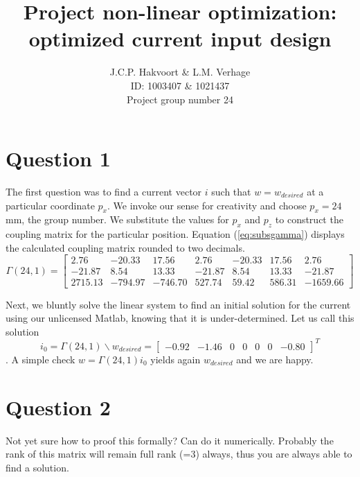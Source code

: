 \documentclass[a4paper,10pt]{article}
\begin{document}
\pagestyle{fancy}

\title{Project non-linear optimization: optimized current input design
}
\author{J.C.P. Hakvoort \& L.M. Verhage\\
        ID: 1003407 \& 1021437 \\
        Project group number 24} 


\maketitle
\thispagestyle{empty}

\section{Question 1} \label{sec:question1}
The first question was to find a current vector $i$ such that $w=w_{desired}$ at a particular coordinate $p_x$. We invoke our sense for creativity and choose $p_x=24$ mm, the group number. We substitute the values for $p_x$ and $p_z$ to construct the coupling matrix for the particular position. Equation (\ref{eq:subsgamma}) displays the calculated coupling matrix rounded to two decimals.
\begin{equation} \label{eq:subsgamma}
    \Gamma(24,1)=
\begin{bmatrix}
2.76    & -20.33    & 17.56     & 2.76      & -20.33    & 17.56     & 2.76 \\
-21.87  & 8.54      & 13.33     & -21.87    & 8.54      & 13.33     & -21.87 \\
2715.13 & -794.97   & -746.70   & 527.74    &	59.42   & 586.31    & -1659.66 
\end{bmatrix}
\end{equation}

Next, we bluntly solve the linear system to find an initial solution for the current using our unlicensed Matlab, knowing that it is under-determined. Let us call this solution $$i_0 = \Gamma(24,1)\backslash w_{desired} = \begin{bmatrix} -0.92& -1.46& 0& 0& 0& 0& -0.80 \end{bmatrix} ^T$$. A simple check $w=\Gamma(24,1)i_0$ yields again $w_{desired}$ and we are happy.

\section{Question 2} \label{sec:question2}
Not yet sure how to proof this formally? Can do it numerically. Probably the rank of this matrix will remain full rank (=3) always, thus you are always able to find a solution.
\end{document}
